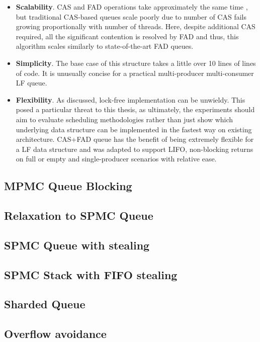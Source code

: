 \documentclass[12pt,a4paper,twoside]{report}
\begin{document}
\begin{itemize}
    \item \textbf{Scalability}. CAS and FAD operations take approximately the same time \cite{fad-cas-speed}, but traditional CAS-based queues scale poorly due to number of CAS fails growing proportionally with number of threads. Here, despite additional CAS required, all the significant contention is resolved by FAD and thus, this algorithm scales similarly to state-of-the-art FAD queues.
    \item \textbf{Simplicity}. The base case of this structure takes a little over 10 lines of lines of code. It is unusually concise for a practical multi-producer multi-consumer LF queue. 
    \item \textbf{Flexibility}. As discussed, lock-free implementation can be unwieldy. This posed a particular threat to this thesis, as ultimately, the experiments should aim to evaluate scheduling methodologies rather than just show which underlying data structure can be implemented in the fastest way on existing architecture. CAS+FAD queue has the benefit of being extremely flexible for a LF data structure and was adapted to support LIFO, non-blocking returns on full or empty and single-producer scenarios with relative ease.
\end{itemize}




\subsection{MPMC Queue Blocking}
\subsection{Relaxation to SPMC Queue}
\subsection{SPMC Queue with stealing}
\subsection{SPMC Stack with FIFO stealing}
\subsection{Sharded Queue}
\subsection{Overflow avoidance}
\end{document}
